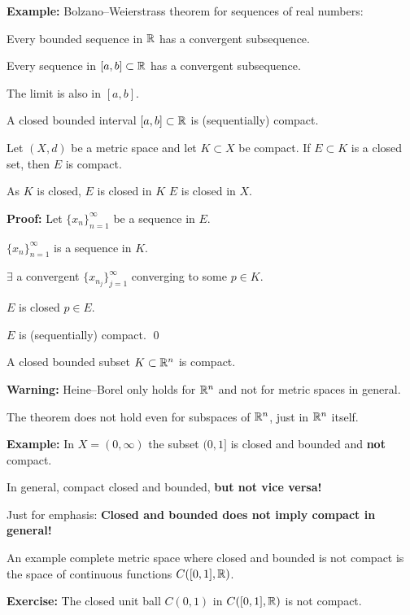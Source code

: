 \documentclass[10pt,aspectratio=149]{beamer}
\begin{document}
\begin{frame}

\textbf{Example:}
Bolzano--Weierstrass theorem for sequences of real numbers:

Every bounded sequence in ${\mathbb{R}}$ has a convergent subsequence.

\pause
\thus \quad Every sequence in $[a,b] \subset {\mathbb{R}}$ has 
a convergent subsequence.

\pause
\thus \quad The limit is also in $[a,b]$.

\pause
\thus \quad A closed bounded interval $[a,b] \subset {\mathbb{R}}$ is (sequentially) compact.

\pause
\begin{proposition}
Let $(X,d)$ be a metric space and let $K \subset X$ be compact.  If
$E \subset K$ is a closed set, then $E$ is compact.
\end{proposition}

\pause
As $K$ is closed, $E$ is closed in $K$ \wiffif
$E$ is closed in $X$.

\pause
\medskip

\textbf{Proof:}
Let $\{ x_n \}_{n=1}^\infty$ be a sequence in $E$.

\pause
$\{ x_n \}_{n=1}^\infty$ is a sequence in $K$.

\pause
\thus \quad $\exists$ a convergent $\{ x_{n_j} \}_{j=1}^\infty$ converging
to some $p \in K$.

\pause
$E$ is closed \wthus $p \in E$.

\pause
\thus \quad $E$ is (sequentially) compact.
\qed

\end{frame}

\begin{frame}

\begin{theorem}
A closed bounded subset $K \subset {\mathbb{R}}^n$ is compact.
\end{theorem}

\pause
\textbf{Warning:}
Heine--Borel only holds for ${\mathbb{R}}^n$ and not for metric spaces in general.

\pause
The theorem does not hold even for subspaces of ${\mathbb{R}}^n$, just in ${\mathbb{R}}^n$
itself.

\pause
\medskip

\textbf{Example:} In $X = (0,\infty)$ the subset $(0,1]$ is closed and
bounded and \textbf{not} compact.

\pause
\medskip

In general, compact \wthus closed and bounded, \textbf{but not vice versa!}

\pause
\medskip

Just for emphasis:
\textbf{Closed and bounded does not imply compact in general!}

\medskip
\pause

An example complete metric space where closed and bounded is not
compact is the space of continuous functions $C([0,1],{\mathbb{R}})$.

\medskip
\pause

\textbf{Exercise:} The closed unit ball $C(0,1)$ in $C([0,1],{\mathbb{R}})$ is not compact.

\end{frame}
\end{document}
